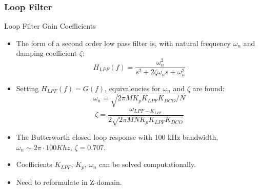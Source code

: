 \documentclass[t, screen, aspectratio=43]{beamer}
\begin{document}
\begin{frame}
	\frametitle{Loop Filter}
	\begin{block}{Loop Filter Gain Coefficients}
		\begin{itemize}
			\scriptsize
			\item The form of a second order low pass filter is, with natural frequency $\omega_n$ and damping coefficient $\zeta$:
			\tiny
			\begin{equation}
				H_{LPF}(f) = \frac{\omega_n^2}{s^2 + 2\zeta\omega_ns + \omega_n^2}
			\end{equation}
			\scriptsize
			\item Setting $H_{LPF}(f) = G(f)$, equivalencies for $\omega_n$ and $\zeta$ are found:
			\tiny
			\begin{equation}
				\omega_n = \sqrt{2\pi M K_pK_{LPF}K_{DCO}/N}
			\end{equation}			
			\begin{equation}
				\zeta = \frac{\omega_{LPF - K_{LPF}}}{2\sqrt{2\pi MN K_pK_{LPF}K_{DCO}}}
			\end{equation}	
			\scriptsize
			\item The Butterworth closed loop response with 100 kHz bandwidth, $\omega_n \sim 2\pi\cdot 100 Khz$, $\zeta=0.707$.
			\item Coefficients $K_{LPF}$, $K_p$, $\omega_n$ can be solved computationally.
			\item Need to reformulate in Z-domain.
		\end{itemize} 	 
	\end{block}
\end{frame}
\end{document}
